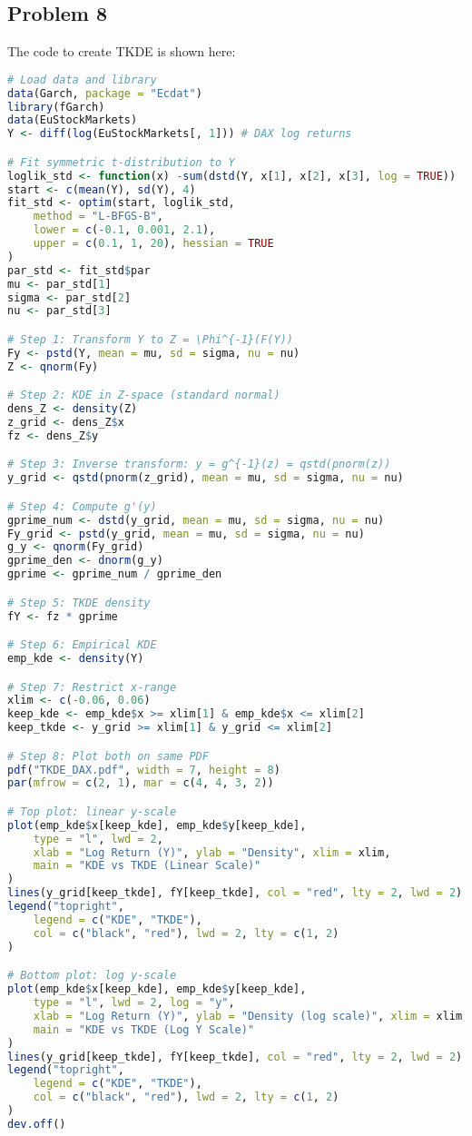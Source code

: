 \documentclass{article}
\begin{document}
\subsection{Problem 8}
The code to create TKDE is shown here:
\begin{lstlisting}[language=R, basicstyle=\ttfamily\footnotesize]
# Load data and library
data(Garch, package = "Ecdat")
library(fGarch)
data(EuStockMarkets)
Y <- diff(log(EuStockMarkets[, 1])) # DAX log returns

# Fit symmetric t-distribution to Y
loglik_std <- function(x) -sum(dstd(Y, x[1], x[2], x[3], log = TRUE))
start <- c(mean(Y), sd(Y), 4)
fit_std <- optim(start, loglik_std,
    method = "L-BFGS-B",
    lower = c(-0.1, 0.001, 2.1),
    upper = c(0.1, 1, 20), hessian = TRUE
)
par_std <- fit_std$par
mu <- par_std[1]
sigma <- par_std[2]
nu <- par_std[3]

# Step 1: Transform Y to Z = \Phi^{-1}(F(Y))
Fy <- pstd(Y, mean = mu, sd = sigma, nu = nu)
Z <- qnorm(Fy)

# Step 2: KDE in Z-space (standard normal)
dens_Z <- density(Z)
z_grid <- dens_Z$x
fz <- dens_Z$y

# Step 3: Inverse transform: y = g^{-1}(z) = qstd(pnorm(z))
y_grid <- qstd(pnorm(z_grid), mean = mu, sd = sigma, nu = nu)

# Step 4: Compute g'(y)
gprime_num <- dstd(y_grid, mean = mu, sd = sigma, nu = nu)
Fy_grid <- pstd(y_grid, mean = mu, sd = sigma, nu = nu)
g_y <- qnorm(Fy_grid)
gprime_den <- dnorm(g_y)
gprime <- gprime_num / gprime_den

# Step 5: TKDE density
fY <- fz * gprime

# Step 6: Empirical KDE
emp_kde <- density(Y)

# Step 7: Restrict x-range
xlim <- c(-0.06, 0.06)
keep_kde <- emp_kde$x >= xlim[1] & emp_kde$x <= xlim[2]
keep_tkde <- y_grid >= xlim[1] & y_grid <= xlim[2]

# Step 8: Plot both on same PDF
pdf("TKDE_DAX.pdf", width = 7, height = 8)
par(mfrow = c(2, 1), mar = c(4, 4, 3, 2))

# Top plot: linear y-scale
plot(emp_kde$x[keep_kde], emp_kde$y[keep_kde],
    type = "l", lwd = 2,
    xlab = "Log Return (Y)", ylab = "Density", xlim = xlim,
    main = "KDE vs TKDE (Linear Scale)"
)
lines(y_grid[keep_tkde], fY[keep_tkde], col = "red", lty = 2, lwd = 2)
legend("topright",
    legend = c("KDE", "TKDE"),
    col = c("black", "red"), lwd = 2, lty = c(1, 2)
)

# Bottom plot: log y-scale
plot(emp_kde$x[keep_kde], emp_kde$y[keep_kde],
    type = "l", lwd = 2, log = "y",
    xlab = "Log Return (Y)", ylab = "Density (log scale)", xlim = xlim,
    main = "KDE vs TKDE (Log Y Scale)"
)
lines(y_grid[keep_tkde], fY[keep_tkde], col = "red", lty = 2, lwd = 2)
legend("topright",
    legend = c("KDE", "TKDE"),
    col = c("black", "red"), lwd = 2, lty = c(1, 2)
)
dev.off()
\end{lstlisting}
\end{document}

